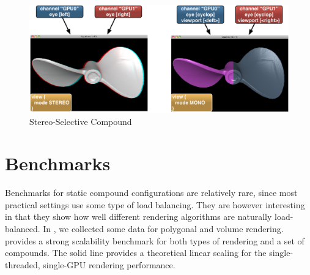 \begin{figure}[h!t]\center
 \includegraphics[width=\columnwidth]{images/stereoSwitch}
 {\caption{\label{fStereoSwitch}Stereo-Selective Compound}}
\end{figure}

\section{Benchmarks}

Benchmarks for static compound configurations are relatively rare, since most
practical settings use some type of load balancing. They are however
interesting in that they show how well different rendering algorithms are
naturally load-balanced. In \cite{ESP:18}, we collected some data for polygonal
and volume rendering.  provides a strong scalability benchmark
for both types of rendering and a set of compounds. The solid line provides a
theoretical linear scaling for the single-threaded, single-GPU rendering
performance.

